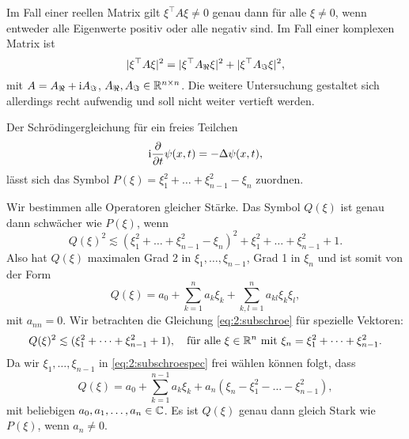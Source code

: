 \begin{exa}
Im Fall einer reellen Matrix gilt $\xi^\top A\xi\neq0$ genau dann für alle $\xi\neq0$,
wenn entweder alle Eigenwerte positiv oder alle negativ sind.
Im Fall einer komplexen Matrix ist
\begin{equation}
\lvert\xi^\top A\xi\rvert^2=\lvert\xi^\top A_\Re\xi\rvert^2+\lvert\xi^\top A_\Im\xi\rvert^2,
\end{equation}
mit $A=A_\Re+\mathrm i A_\Im$, $A_\Re,A_\Im\in\mathbb R^{n\times n}$.
Die weitere Untersuchung gestaltet sich allerdings recht aufwendig
und soll nicht weiter vertieft werden.
\end{exa}

\begin{exa}\label{exa:2:schroe}
Der Schrödingergleichung für ein freies Teilchen
\begin{equation}
\mathrm i\frac{\partial}{\partial t}\psi(x,t)=-\Delta\psi(x,t),\end{equation}
lässt sich das Symbol $P(\xi)=\xi^2_1+\dots+\xi^2_{n-1}-\xi_n$ zuordnen.

Wir bestimmen alle Operatoren gleicher Stärke.
Das Symbol $Q(\xi)$ ist genau dann schwächer wie $P(\xi)$,
wenn
\begin{equation}\label{eq:2:subschroe}
Q(\xi)^2\apprle(\xi^2_1+\dots+\xi^2_{n-1}-\xi_n)^2+\xi^2_1+\dots+\xi^2_{n-1}+1.
\end{equation}
Also hat $Q(\xi)$ maximalen Grad 2 in $\xi_1,\dots,\xi_{n-1}$,
Grad 1 in $\xi_n$ und ist somit von der Form
\begin{equation}
Q(\xi)=a_0+\sum^n_{k=1}a_k\xi_k+\sum^n_{k,l=1}a_{kl}\xi_k\xi_l,
\end{equation}
mit $a_{nn}=0$.
Wir betrachten die Gleichung \eqref{eq:2:subschroe}
für spezielle Vektoren:
\begin{equation}\label{eq:2:subschroespec}
Q(\xi)^2\apprle(\xi^2_1+\dots+\xi^2_{n-1}+1),
\quad\text{für alle}~\xi\in\R^n~\text{mit}~\xi_n=\xi^2_1+\dots+\xi^2_{n-1}.
\end{equation}
Da wir $\xi_1,\dots,\xi_{n-1}$ in \eqref{eq:2:subschroespec} frei wählen können folgt, dass
\begin{equation}
Q(\xi)=a_0+\sum_{k=1}^{n-1}a_k\xi_k+a_n(\xi_n-\xi^2_1-\dots-\xi^2_{n-1}),
\end{equation}
mit beliebigen $a_0,a_1,\dots,a_n\in\mathbb C$.
Es ist $Q(\xi)$ genau dann gleich Stark wie $P(\xi)$,
wenn $a_n\neq0$.
\end{exa}

